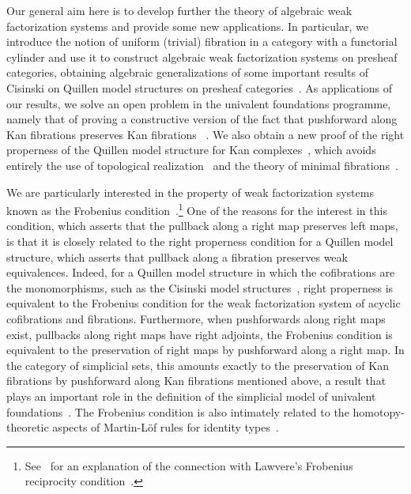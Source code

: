 \documentclass[reqno,10pt,a4paper,oneside,draft]{amsart}
\begin{document}
 Our general aim here is to develop further the theory of algebraic weak factorization systems and provide some new 
 applications. In particular, we introduce the 
 notion of uniform (trivial) fibration in  a category with a functorial cylinder
and use it to construct algebraic weak factorization systems on presheaf categories, obtaining 
  algebraic generalizations of some important results of Cisinski 
on Quillen model structures on presheaf categories~\cite{cisinski-asterisque}.
As applications of our results, we  solve an open problem in the univalent foundations programme, namely that of proving a constructive version of the
 fact that pushforward along Kan fibrations preserves Kan fibrations ~\cite{coquand-non-constructivity-kan,voevodsky-simplicial-model}. We also obtain a new proof of the right 
 properness of the Quillen model structure for Kan complexes~\cite{quillen-homotopical}, 
 which avoids entirely the use of topological realization~\cite{hovey-model-categories} and
 the theory of minimal fibrations~\cite{joyal-tierney:simplicial-homotopy-theory}.

We are particularly  interested in the property of weak factorization systems  
known as the Frobenius 
condition~\cite[Definition~3.2.1]{garner:types-omega-groupoids}.\footnote{See~\cite{clementino:frobenius}
for an explanation of the connection with Lawvere's Frobenius reciprocity 
condition~\cite{lawvere-equality}.}
One of the reasons for the interest in this condition, 
which asserts that  the pullback along a right map preserves left maps, is that it is closely related to the
right properness condition for a Quillen model structure, which asserts that pullback along a fibration preserves weak 
equivalences. Indeed, for 
a Quillen model structure in which the cofibrations are the monomorphisms, such as the Cisinski model structures~\cite{cisinski-asterisque},   
right properness  is equivalent to the Frobenius condition for the  weak factorization system of acyclic cofibrations and fibrations. 
Furthermore, when  pushforwards along right maps exist, \ie pullbacks along  right maps have right adjoints, the Frobenius condition
is equivalent to the preservation of right maps by pushforward along a right map. In the category of simplicial sets, this amounts exactly to the preservation of Kan fibrations by pushforward along Kan fibrations mentioned above, 
a result that plays an important role in the definition of the simplicial model of univalent foundations~\cite[Lemma~2.3.1]{voevodsky-simplicial-model}. The Frobenius condition is also intimately related to the homotopy-theoretic aspects of Martin-L\"of rules for identity types~\cite{gambino-garner:idtypewfs}.
\end{document}
